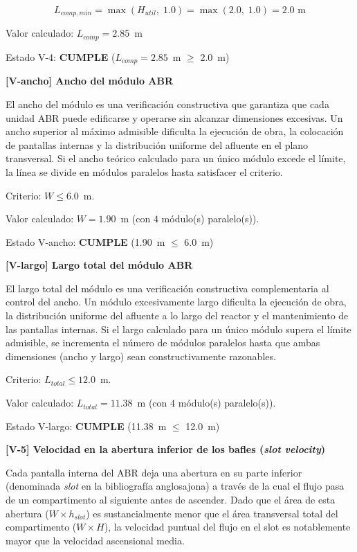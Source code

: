 \documentclass[12pt,a4paper]{article}
\begin{document}
\begin{equation}
L_{comp,min} = \max\!\left(H_{util},\; 1.0\right) = \max\!\left(2.0,\; 1.0\right) = 2.0 \text{ m}
\end{equation}

Valor calculado: $L_{comp} = 2.85$~m

Estado V-4: \textbf{CUMPLE} ($L_{comp} = 2.85$~m $\geq$ 2.0~m)

\textbf{[V-ancho] Ancho del módulo ABR}

El ancho del módulo es una verificación constructiva que garantiza que cada unidad ABR puede edificarse y operarse sin alcanzar dimensiones excesivas. Un ancho superior al máximo admisible dificulta la ejecución de obra, la colocación de pantallas internas y la distribución uniforme del afluente en el plano transversal. Si el ancho teórico calculado para un único módulo excede el límite, la línea se divide en módulos paralelos hasta satisfacer el criterio.

Criterio: $W \leq 6.0$~m.

Valor calculado: $W = 1.90$~m (con $4$ módulo(s) paralelo(s)).

Estado V-ancho: \textbf{CUMPLE} (1.90~m $\leq$ 6.0~m)

\textbf{[V-largo] Largo total del módulo ABR}

El largo total del módulo es una verificación constructiva complementaria al control del ancho. Un módulo excesivamente largo dificulta la ejecución de obra, la distribución uniforme del afluente a lo largo del reactor y el mantenimiento de las pantallas internas. Si el largo calculado para un único módulo supera el límite admisible, se incrementa el número de módulos paralelos hasta que ambas dimensiones (ancho y largo) sean constructivamente razonables.

Criterio: $L_{total} \leq 12.0$~m.

Valor calculado: $L_{total} = 11.38$~m (con $4$ módulo(s) paralelo(s)).

Estado V-largo: \textbf{CUMPLE} (11.38~m $\leq$ 12.0~m)

\textbf{[V-5] Velocidad en la abertura inferior de los bafles (\textit{slot velocity})}

Cada pantalla interna del ABR deja una abertura en su parte inferior (denominada \textit{slot} en la bibliografía anglosajona) a través de la cual el flujo pasa de un compartimento al siguiente antes de ascender. Dado que el área de esta abertura ($W \times h_{slot}$) es sustancialmente menor que el área transversal total del compartimento ($W \times H$), la velocidad puntual del flujo en el slot es notablemente mayor que la velocidad ascensional media.
\end{document}
